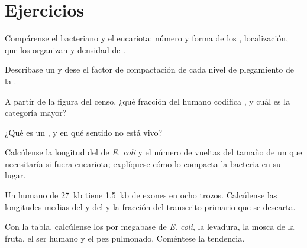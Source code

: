 \section{Ejercicios}

\begin{exercise}[$\star$]\label{exo:b1:genomes:1}
Compárense el  bacteriano y el eucariota: número y forma de los
, localización,  que los organizan y densidad de .
\end{exercise}

\begin{exercise}[$\star$]\label{exo:b1:genomes:2}
Descríbase un  y dese el factor de compactación de cada nivel de
plegamiento de la .
\end{exercise}

\begin{exercise}[$\star$]\label{exo:b1:genomes:3}
A partir de la figura del censo, ¿qué fracción del  humano codifica
, y cuál es la categoría mayor?
\end{exercise}

\begin{exercise}[$\star$]\label{exo:b1:genomes:4}
¿Qué es un , y en qué sentido no está vivo?
\end{exercise}

\begin{exercise}[$\star\star$]\label{exo:b1:genomes:5}
Calcúlense la longitud del  de \emph{E. coli} y el número de
vueltas del tamaño de un  que necesitaría si fuera eucariota;
explíquese cómo lo compacta la bacteria en su lugar.
\end{exercise}

\begin{exercise}[$\star\star$]\label{exo:b1:genomes:6}
Un  humano de \qty{27}{kb} tiene \qty{1.5}{kb} de exones en ocho trozos.
Calcúlense las longitudes medias del  y del  y la fracción del
transcrito primario que se descarta.
\end{exercise}

\begin{exercise}[$\star\star$]\label{exo:b1:genomes:7}
Con la tabla, calcúlense los  por megabase de \emph{E. coli}, la
levadura, la mosca de la fruta, el ser humano y el pez pulmonado.
Coméntese la tendencia.
\end{exercise}

